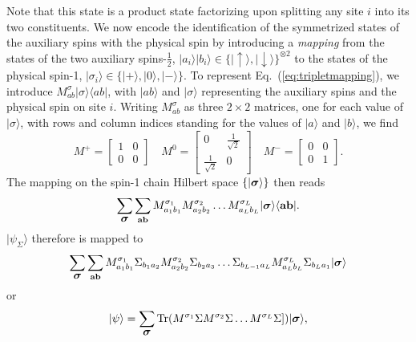 \documentclass[a4paper,10pt,oneside,onecolumn,1p,times]{elsarticle}
\newcommand{\tr}{{\rm Tr }}
\newcommand{\bra}[1]{\mbox{$\langle #1  |$}}
\newcommand{\ket}[1]{\mbox{$| #1  \rangle$}}
\newcommand{\fat}[1]{\mbox{\boldmath$#1$\unboldmath}}	%
\newcommand{\syslength}{L}
\newcommand{\Eq}[1]{Eq.~(\ref{#1})}
\begin{document}
Note that this state is a product state factorizing upon splitting any site $i$ into its two constituents. We now encode the identification of the symmetrized states of the auxiliary spins with the physical spin by introducing a {\em mapping} from the 
states of the two auxiliary spins-$\frac{1}{2}$, $\ket{a_i}\ket{b_i} \in \{ 
\ket{\uparrow},\ket{\downarrow}\}^{\otimes 2}$ to the states of the 
physical spin-1, $\ket{\sigma_i} \in \{ \ket{+},\ket{0},\ket{-} \}$. To represent \Eq{eq:tripletmapping}, we introduce $M_{ab}^{\sigma} 
\ket{\sigma} \bra{ab}$, with $\ket{ab}$ and $\ket{\sigma}$ representing the auxiliary spins and the physical spin on site $i$. Writing $M_{ab}^{\sigma}$ as three $2\times 2$  matrices, one for each value of $\ket{\sigma}$, with rows and column indices standing for the values of $\ket{a}$ and $\ket{b}$, we find
\begin{equation}
    M^+ = \left[ \begin{array}{cc} 1 & 0 \\ 0 & 0 \end{array} \right] \quad
    M^0 = \left[ \begin{array}{cc} 0 & \frac{1}{\sqrt{2}} \\ 
    \frac{1}{\sqrt{2}} & 0 \end{array} \right] \quad
    M^- = \left[ \begin{array}{cc} 0 & 0 \\ 0 & 1 \end{array} \right] .
\end{equation}
The mapping on the spin-1 chain Hilbert space $\{ \ket{\fat{\sigma}} \}$ then reads
\begin{equation} 
\sum_{\fat{\sigma}} \sum_{{\bf a}{\bf b}} M^{\sigma_1}_{a_1 b_1} M^{\sigma_2}_{a_2 b_2} \ldots M^{\sigma_\syslength}_{a_\syslength b_\syslength}
\ket{\fat{\sigma}} \bra{{\bf a}{\bf b}} .
\end{equation}
$\ket{\psi_\Sigma}$ therefore is mapped to 
\begin{equation}
\sum_{\fat{\sigma}} \sum_{{\bf a}{\bf b}} M^{\sigma_1}_{a_1 b_1} \Sigma_{b_1 a_2}
M^{\sigma_2}_{a_2 b_2} \Sigma_{b_2 a_3} \ldots \Sigma_{b_{\syslength-1} a_\syslength} 
M^{\sigma_\syslength}_{a_\syslength b_\syslength} \Sigma_{b_\syslength a_1} 
\ket{\fat{\sigma}}
\end{equation}
or
\begin{equation}
    \ket{\psi} = \sum_{\fat{\sigma}} \tr (M^{\sigma_{1}} \Sigma
    M^{\sigma_{2}} \Sigma \ldots M^{\sigma_{\syslength}} \Sigma] ) \ket{\fat{\sigma}} ,
\end{equation}
\end{document}
